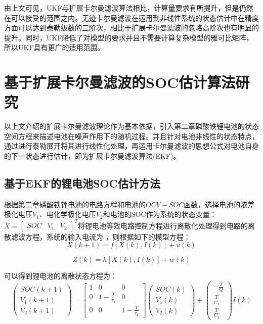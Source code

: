 由上文可见，UKF与扩展卡尔曼滤波算法相比，计算量要求有所提升，但是仍然在可以接受的范围之内。无迹卡尔曼滤波在运用到非线性系统的状态估计中在精度方面可以达到泰勒级数的三阶次，相比于扩展卡尔曼滤波的忽略高阶次也有明显的提升。同时，UKF降低了对模型的要求并且不需要计算复杂模型的雅可比矩阵，所以UKF具有更广的适用范围。
\section{基于扩展卡尔曼滤波的SOC估计算法研究}
以上文介绍的扩展卡尔曼滤波理论作为基本依据，引入第二章磷酸铁锂电池的状态空间方程来描述电池在噪声作用下的随机过程。并且针对电池非线性的状态特点，通过进行泰勒展开将其进行线性化处理，再运用卡尔曼滤波的思想公式对电池自身的下一状态进行估计，即为扩展卡尔曼滤波算法(EKF)。
\subsection{基于EKF的锂电池SOC估计方法}
根据第二章磷酸铁锂电池的电路方程和电池的$OCV - SOC$函数，选择电池的浓差极化电压${V_1}$、电化学极化电压${V_2}$和电池的SOC作为系统的状态变量：$X = {\left[ {\begin{array}{*{20}{c}}
{SOC}&{{V_1}}&{{V_2}}
\end{array}} \right]^T}$将锂电池等效电路控制方程进行离散化处理得到电路的离散滤波方程，系统的输入电流为 ，则根据如下的模型方程：
\begin{equation}
X\left( {k + 1} \right) = f\left[ {X\left( k \right),I\left( k \right)} \right] + u\left( k \right)
\end{equation} 

\begin{equation}
Z\left( k \right) = h\left[ {X\left( k \right),I\left( k \right)} \right] + w\left( k \right)
\end{equation} 

可以得到锂电池的离散状态方程为：
\begin{equation}
\left( {\begin{array}{*{20}{c}}
{SOC\left( {k + 1} \right)}\\
{{V_1}\left( {k + 1} \right)}\\
{{V_2}\left( {k + 1} \right)}
\end{array}} \right) = \left[ {\begin{array}{*{20}{c}}
1&0&0\\
0&{1 - \frac{T}{{{\tau _1}}}}&0\\
0&0&{1 - \frac{T}{{{\tau _2}}}}
\end{array}} \right]\left( {\begin{array}{*{20}{c}}
{SOC\left( k \right)}\\
{{V_1}\left( k \right)}\\
{{V_2}\left( k \right)}
\end{array}} \right) + \left( {\begin{array}{*{20}{c}}
{ - \frac{T}{Q}}\\
{\frac{T}{{{C_1}}}}\\
{\frac{T}{{{C_2}}}}
\end{array}} \right)I\left( k \right)
\end{equation} 

